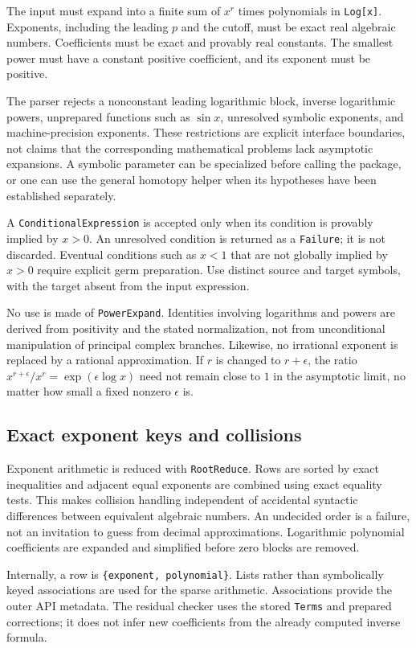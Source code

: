 \documentclass[11pt,a4paper]{article}
\numberwithin{equation}{section}
\theoremstyle{definition}
\theoremstyle{remark}
\newcommand{\code}[1]{\texttt{#1}}
\begin{document}
The input must expand into a finite sum of $x^r$ times polynomials in
\code{Log[x]}. Exponents, including the leading $p$ and the cutoff, must
be exact real algebraic numbers. Coefficients must be exact and provably
real constants. The smallest power must have a constant positive
coefficient, and its exponent must be positive.

The parser rejects a nonconstant leading logarithmic block, inverse
logarithmic powers, unprepared functions such as $\sin x$, unresolved
symbolic exponents, and machine-precision exponents. These restrictions
are explicit interface boundaries, not claims that the corresponding
mathematical problems lack asymptotic expansions. A symbolic parameter can
be specialized before calling the package, or one can use the general
homotopy helper when its hypotheses have been established separately.

A \code{ConditionalExpression} is accepted only when its condition is
provably implied by $x>0$. An unresolved condition is returned as a
\code{Failure}; it is not discarded. Eventual conditions such as $x<1$
that are not globally implied by $x>0$ require explicit germ preparation.
Use distinct source and target symbols, with the target absent from the
input expression.

No use is made of \code{PowerExpand}. Identities involving logarithms and
powers are derived from positivity and the stated normalization, not from
unconditional manipulation of principal complex branches. Likewise, no
irrational exponent is replaced by a rational approximation. If
$r$ is changed to $r+\epsilon$, the ratio $x^{r+\epsilon}/x^r=
\exp(\epsilon\log x)$ need not remain close to $1$ in the asymptotic limit,
no matter how small a fixed nonzero $\epsilon$ is.

\subsection{Exact exponent keys and collisions}

Exponent arithmetic is reduced with \code{RootReduce}. Rows are sorted by
exact inequalities and adjacent equal exponents are combined using exact
equality tests. This makes collision handling independent of accidental
syntactic differences between equivalent algebraic numbers. An undecided
order is a failure, not an invitation to guess from decimal approximations.
Logarithmic polynomial coefficients are expanded and simplified before
zero blocks are removed.

Internally, a row is \code{\{exponent, polynomial\}}. Lists rather than
symbolically keyed associations are used for the sparse arithmetic.
Associations provide the outer API metadata. The residual checker uses
the stored \code{Terms} and prepared corrections; it does not infer new
coefficients from the already computed inverse formula.
\end{document}
